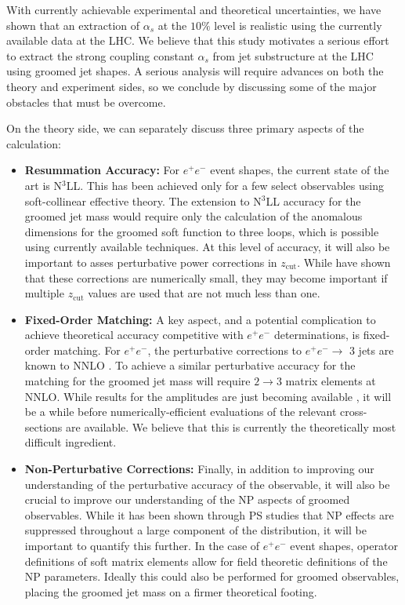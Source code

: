 \documentclass[11pt]{cernrep}
\begin{document}
With currently achievable experimental and theoretical uncertainties, we have shown that an extraction of $\alpha_s$ at the $10\%$ level is realistic using the currently available data at the LHC.
%
We believe that this study motivates a serious effort to extract the strong coupling constant $\alpha_s$ from jet substructure at the LHC using groomed jet shapes.
%
A serious analysis will require advances on both the theory and experiment sides, so we conclude by discussing some of the major obstacles that must be overcome.

On the theory side, we can separately discuss three primary aspects of the calculation:
%
\begin{itemize}
\item {\bf Resummation Accuracy:} For $e^+e^-$ event shapes, the current state of the art is N$^3$LL.
%
This has been achieved only for a few select observables using soft-collinear effective theory.
%
The extension to N$^3$LL accuracy for the groomed jet mass would require only the calculation of the anomalous dimensions for the groomed soft function to three loops, which is possible using currently available techniques.
%
At this level of accuracy, it will also be important to asses perturbative power corrections in $z_{\mathrm{cut}}$.
%
While \cite{Marzani:2017kqd,Marzani:2017mva} have shown that these corrections are numerically small, they may become important if multiple $z_{\mathrm{cut}}$ values are used that are not much less than one.
%
\item {\bf Fixed-Order Matching:} A key aspect, and a potential complication to achieve theoretical accuracy competitive with $e^+e^-$ determinations, is fixed-order matching.
%
For $e^+e^-$, the perturbative corrections to $e^+e^- \rightarrow$ 3 jets are known to NNLO \cite{GehrmannDeRidder:2007hr,Gehrmann-DeRidder:2007nzq,Weinzierl:2008iv,Weinzierl:2009ms}.
%
To achieve a similar perturbative accuracy for the matching for the groomed jet mass will require $2\rightarrow 3$ matrix elements at NNLO.
%
While results for the amplitudes are just becoming available \cite{Gehrmann:2015bfy,Dunbar:2016aux,Badger:2013yda,Badger:2017jhb,Abreu:2017hqn}, it will be a while before numerically-efficient evaluations of the relevant cross-sections are available.
%
We believe that this is currently the theoretically most difficult ingredient.
%
\item {\bf Non-Perturbative Corrections:} Finally, in addition to improving our understanding of the perturbative accuracy of the observable, it will also be crucial to improve our understanding of the NP aspects of groomed observables.
%
While it has been shown through PS studies that NP effects are suppressed throughout a large component of the distribution, it will be important to quantify this further.
%
In the case of $e^+e^-$ event shapes, operator definitions of soft matrix elements allow for field theoretic definitions of the NP parameters.
%
Ideally this could also be performed for groomed observables, placing the groomed jet mass on a firmer theoretical footing.
%
\end{itemize}
\end{document}
